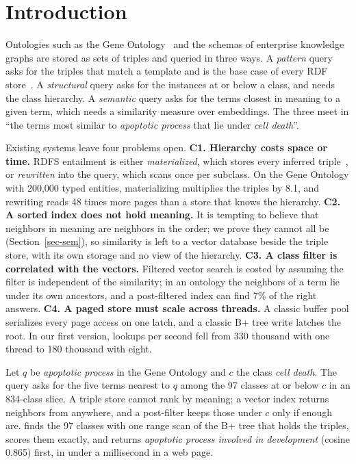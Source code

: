 \section{Introduction}
\label{sec-intro}

Ontologies such as the Gene Ontology~\cite{ashburner2000} and the schemas of
enterprise knowledge graphs are stored as sets of triples and queried in
three ways.
A \emph{pattern} query asks for the triples that match a template and is the
base case of every RDF store~\cite{weiss2008,neumann2010}.
A \emph{structural} query asks for the instances at or below a class, and
needs the class hierarchy.
A \emph{semantic} query asks for the terms closest in meaning to a given
term, which needs a similarity measure over embeddings.
The three meet in ``the terms most similar to \emph{apoptotic process} that
lie under \emph{cell death}''.

Existing systems leave four problems open.
\textbf{C1. Hierarchy costs space or time.}
RDFS entailment is either \emph{materialized}, which stores every inferred
triple~\cite{rdfox}, or \emph{rewritten} into the query, which scans once per
subclass.
On the Gene Ontology with 200,000 typed entities, materializing multiplies
the triples by 8.1, and rewriting reads 48 times more pages than a store that
knows the hierarchy.
\textbf{C2. A sorted index does not hold meaning.}
It is tempting to believe that neighbors in meaning are neighbors in the
order; we prove they cannot all be (Section~\ref{sec-sem}), so similarity is
left to a vector database beside the triple store, with its own storage and
no view of the hierarchy.
\textbf{C3. A class filter is correlated with the vectors.}
Filtered vector search is costed by assuming the filter is independent of the
similarity; in an ontology the neighbors of a term lie under its own
ancestors, and a post-filtered index can find 7\% of the right answers.
\textbf{C4. A paged store must scale across threads.}
A classic buffer pool serializes every page access on one latch, and a classic
B+ tree write latches the root.
In our first version, lookups per second fell from 330 thousand with one
thread to 180 thousand with eight.

\begin{example}
\label{exa-motivation}
Let $q$ be \emph{apoptotic process} in the Gene Ontology and $c$ the class
\emph{cell death}.
The query asks for the five terms nearest to $q$ among the 97 classes at or
below $c$ in an 834-class slice.
A triple store cannot rank by meaning; a vector index returns neighbors from
anywhere, and a post-filter keeps those under $c$ only if enough are.
\sys finds the 97 classes with one range scan of the B+ tree that holds the
triples, scores them exactly, and returns \emph{apoptotic process involved in
development} (cosine 0.865) first, in under a millisecond in a web page.
\end{example}

